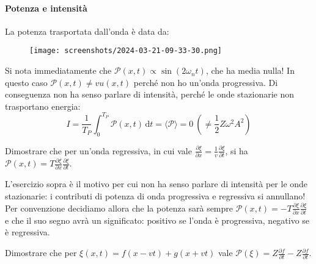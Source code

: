\paragraph{Potenza e intensità}
La potenza trasportata dall'onda è data da:
\begin{figure}[H]
	\centering
	\texttt{[image: screenshots/2024-03-21-09-33-30.png]}
\end{figure}
Si nota immediatamente che \(\mathcal{P} (x,t) \propto \sin (2 \omega _n t)\), che ha media nulla! In questo caso \(\mathcal{P} (x,t) \neq v u(x,t)\) perché non ho un'onda progressiva. Di conseguenza non ha senso parlare di intensità, perché le onde stazionarie non trasportano energia:
\[
	I=\frac{1}{T_P}\int_{0}^{T_P} \mathcal{P} (x,t) \,\mathrm{d}t = \langle \mathcal{P} \rangle =0 \ \left(\neq \frac{1}{2}Z \omega ^{2} A ^{2} \right)
\]
\begin{exercise}
	Dimostrare che per un'onda regressiva, in cui vale \(\frac{\partial \xi }{\partial x} = \frac{1}{v} \frac{\partial \xi }{\partial t}  \), si ha \(\mathcal{P} (x,t) = T \frac{\partial \xi }{\partial x} \frac{\partial \xi }{\partial t} \).
\end{exercise}
L'esercizio sopra è il motivo per cui non ha senso parlare di intensità per le onde stazionarie: i contributi di potenza di onda progressiva e regressiva si annullano! Per convenzione decidiamo allora che la potenza sarà sempre \(\mathcal{P} (x,t) = -T \frac{\partial \xi }{\partial x} \frac{\partial \xi }{\partial t}  \) e che il suo segno avrà un significato: positivo se l'onda è progressiva, negativo se è regressiva.
\begin{exercise}
	Dimostrare che per \(\xi (x,t) = f(x-vt) + g(x+vt)\) vale \(\mathcal{P} (\xi )= Z \frac{\partial f}{\partial t} - Z \frac{\partial f}{\partial t}\).
\end{exercise}

